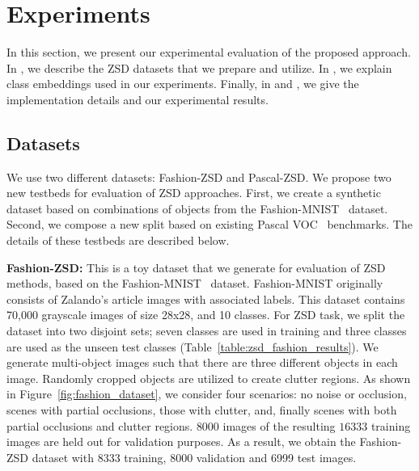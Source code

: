 \section{Experiments}

In this section, we present our experimental evaluation of the proposed approach.  In , we describe the
ZSD datasets that we prepare and utilize.  In , we explain class embeddings used in our experiments.
Finally, in  and , we give the implementation details and our experimental results.

\subsection{Datasets}
\label{sec:dataset}

We use two different datasets: Fashion-ZSD and Pascal-ZSD. 
We propose two new testbeds for evaluation of ZSD approaches. First, we create a synthetic dataset based on combinations
of objects from the Fashion-MNIST~\cite{xiao2017fashion} dataset. Second, 
we compose a new split based on existing Pascal VOC~\cite{pascal_voc_IJCV} benchmarks.
The details of these testbeds are described below.

\vspace{2mm}

\noindent \textbf{Fashion-ZSD:} This is a toy dataset that we generate for evaluation of ZSD methods, based on the Fashion-MNIST~\cite{xiao2017fashion} dataset. Fashion-MNIST originally consists of Zalando's article images with associated labels. This dataset contains 70,000 grayscale images of size 28x28, and 10 classes. For ZSD task, we split the dataset into two disjoint sets; seven classes are used in training and three classes are used as the unseen test classes (Table~\ref{table:zsd_fashion_results}). We generate multi-object images such that there are three different objects in each image. Randomly cropped objects are utilized to create clutter regions. As shown in Figure~\ref{fig:fashion_dataset}, we consider four scenarios: no noise or occlusion, scenes with partial occlusions, those with clutter, and, finally scenes with both partial occlusions and clutter regions. $8000$ images of the resulting $16333$ training images are held out for validation purposes. As a result, we obtain the Fashion-ZSD dataset with 8333 training, 8000 validation and 6999 test images. 


